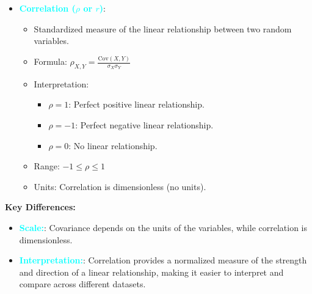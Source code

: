 \documentclass{report}
\begin{document}
\begin{itemize}
\begin{itemize}
                \item \textbf{\textcolor{cyan}{Correlation (\(\rho\) or \(r\))}}:
                    \begin{itemize}
                        \item Standardized measure of the linear relationship between two random variables.
                        \item Formula: \(\rho_{X,Y} = \frac{\text{Cov}(X, Y)}{\sigma_X \sigma_Y}\)
                        \item Interpretation:
                            \begin{itemize}
                                \item \(\rho = 1\): Perfect positive linear relationship.
                                \item \(\rho = -1\): Perfect negative linear relationship.
                                \item \(\rho = 0\): No linear relationship.
                            \end{itemize}
                        \item Range: \(-1 \leq \rho \leq 1\)
                        \item Units: Correlation is dimensionless (no units).
                    \end{itemize}
            \end{itemize}

            \textbf{Key Differences:}
            \begin{itemize}
                \item \textbf{\textcolor{cyan}{Scale:}}: Covariance depends on the units of the variables, while correlation is dimensionless.
                \item \textbf{\textcolor{cyan}{Interpretation:}}: Correlation provides a normalized measure of the strength and direction of a linear relationship, making it easier to interpret and compare across different datasets.
            \end{itemize}


\end{itemize}
\end{document}
